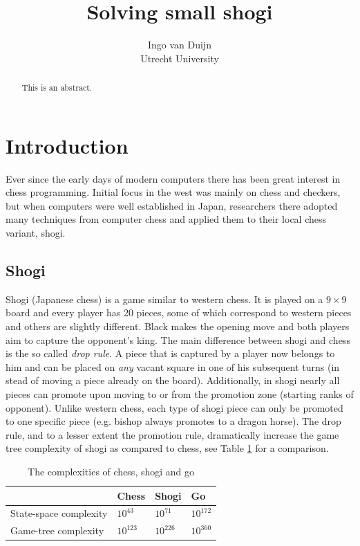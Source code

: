 \documentclass{article}
\title{Solving small shogi}
\author{Ingo van Duijn \\ Utrecht University}
\begin{document}
\maketitle

\begin{abstract}
This is an abstract.
\end{abstract}

\section{Introduction}
Ever since the early days of modern computers there has been great interest in chess programming. Initial
focus in the west was mainly on chess and checkers, but when computers were well established in Japan, researchers there adopted
many techniques from computer chess and applied them to their local chess variant, shogi.

\subsection{Shogi}
Shogi (Japanese chess) is a game similar to western chess. It is played on a $9 \times 9$ board and every
player has 20 pieces, some of which correspond to western pieces and others are slightly different.
Black makes the opening move and both players aim to capture the opponent's king.
The main difference between shogi and chess is the so called \emph{drop rule}.
A piece that is captured by a player now belongs to him and can be placed on \textit{any} vacant square in one of his subsequent turns
(in stead of moving a piece already on the board).
Additionally, in shogi nearly all pieces can promote upon moving to or from the promotion zone (starting ranks of opponent).
Unlike western chess, each type of shogi piece can only be promoted to one specific piece (e.g. bishop always promotes to a dragon horse).
The drop rule, and to a lesser extent the promotion rule, dramatically increase the game tree complexity of shogi as compared to chess, see Table
\ref{table:complex} for a comparison.\\
\begin{table}
\center
\begin{tabular}{l l l l}
 & Chess & Shogi & Go \\ \hline
State-space complexity & $10^{43}$ & $10^{71}$ & $10^{172}$ \\
Game-tree complexity & $10^{123}$ & $10^{226}$ & $10^{360}$ \\ \hline
\end{tabular}
\caption{The complexities of chess, shogi and go}
\label{table:complex}
\end{table}
\end{document}
